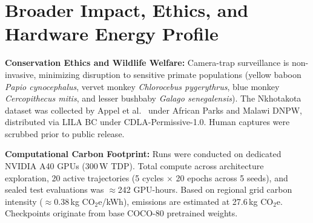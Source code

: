 \documentclass[conference]{IEEEtran}
\begin{document}
\begin{table}[h]
\centering
\renewcommand{\arraystretch}{0.80}
\caption{Authentic Camera Station Profiles for Held-Out Validation ($\mathcal{D}_\text{val}$) and Test ($\mathcal{D}_\text{test}$) Splits in Nkhotakota Reserve.}
\label{tab:stations}
\end{table}

\section{Broader Impact, Ethics, and Hardware Energy Profile}
\label{app:impact}

\noindent\textbf{Conservation Ethics and Wildlife Welfare:} Camera-trap surveillance is non-invasive, minimizing disruption to sensitive primate populations (yellow baboon \emph{Papio cynocephalus}, vervet monkey \emph{Chlorocebus pygerythrus}, blue monkey \emph{Cercopithecus mitis}, and lesser bushbaby \emph{Galago senegalensis}). The Nkhotakota dataset was collected by Appel et al.~\cite{wearn2019camera} under African Parks and Malawi DNPW, distributed via LILA BC under CDLA-Permissive-1.0. Human captures were scrubbed prior to public release.

\noindent\textbf{Computational Carbon Footprint:} Runs were conducted on dedicated NVIDIA A40 GPUs (300\,W TDP). Total compute across architecture exploration, 20 active trajectories (5 cycles $\times$ 20 epochs across 5 seeds), and sealed test evaluations was $\approx$242 GPU-hours. Based on regional grid carbon intensity ($\approx 0.38$\,kg CO$_2$e/kWh), emissions are estimated at 27.6\,kg CO$_2$e. Checkpoints originate from base COCO-80 pretrained weights.
\end{document}
